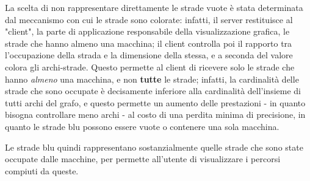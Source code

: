 \documentclass[main.tex]{subfiles}
\begin{document}
La scelta di non rappresentare direttamente le strade vuote è stata determinata dal meccanismo con cui le strade sono colorate: infatti, il server restituisce al "client", la parte di applicazione responsabile della visualizzazione grafica, le strade che hanno almeno una macchina; il client controlla poi il rapporto tra l'occupazione della strada e la dimensione della stessa, e a seconda del valore colora gli archi-strade. Questo permette al client di ricevere solo le strade che hanno \textit{almeno} una macchina, e non \textbf{tutte} le strade; infatti, la cardinalità delle strade che sono occupate è decisamente inferiore alla cardinalità dell'insieme di tutti archi del grafo, e questo permette un aumento delle prestazioni - in quanto bisogna controllare meno archi - al costo di una perdita minima di precisione, in quanto le strade blu possono essere vuote o contenere una sola macchina. 

Le strade blu quindi rappresentano sostanzialmente quelle strade che sono state occupate dalle macchine, per permette all'utente di visualizzare i percorsi compiuti da queste. 
\end{document}
